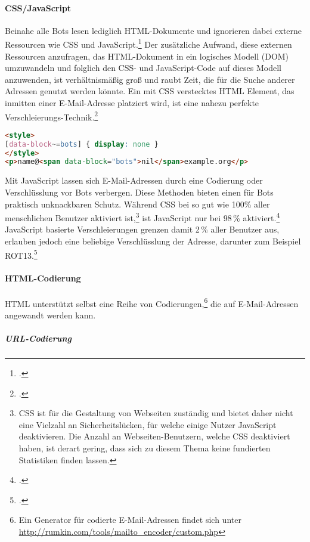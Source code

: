 \paragraph{CSS/JavaScript}
\label{par:cssjavascript}

Beinahe alle Bots lesen lediglich HTML-Dokumente und ignorieren dabei externe
Ressourcen wie CSS und JavaScript.\footcite{hideEmailAddress} Der zusätzliche
Aufwand, diese externen Ressourcen anzufragen, das HTML-Dokument in ein
logisches Modell (DOM) umzuwandeln und folglich den CSS- und JavaScript-Code
auf dieses Modell anzuwenden, ist verhältnismäßig groß und raubt Zeit, die für
die Suche anderer Adressen genutzt werden könnte. Ein mit CSS verstecktes HTML
Element, das inmitten einer E-Mail-Adresse platziert wird, ist eine nahezu
perfekte Verschleierungs-Technik.\footcite{obfuscateEmailAddresses}

\begin{lstlisting}[language=HTML]
<style>
[data-block~=bots] { display: none }
</style>
<p>name@<span data-block="bots">nil</span>example.org</p>
\end{lstlisting}

Mit JavaScript lassen sich E-Mail-Adressen durch eine Codierung oder
Verschlüsslung vor Bots verbergen. Diese Methoden bieten einen für Bots
praktisch unknackbaren Schutz. Während CSS bei so gut wie 100\% aller
menschlichen Benutzer aktiviert ist,\footnote{CSS ist für die Gestaltung von
Webseiten zuständig und bietet daher nicht eine Vielzahl an Sicherheitslücken,
für welche einige Nutzer JavaScript deaktivieren. Die Anzahl an
Webseiten-Benutzern, welche CSS deaktiviert haben, ist derart gering, dass sich
zu diesem Thema keine fundierten Statistiken finden lassen.} ist JavaScript nur
bei 98\,\% aktiviert.\footcite{javaScriptDisableStats} JavaScript basierte
Verschleierungen grenzen damit 2\,\% aller Benutzer aus, erlauben jedoch eine
beliebige Verschlüsslung der Adresse, darunter zum Beispiel
ROT13.\footcite{modernCryptanalysis}

\paragraph{HTML-Codierung}
\label{par:html-codierung}

HTML unterstützt selbst eine Reihe von Codierungen,\footnote{Ein Generator für
codierte E-Mail-Adressen findet sich unter
\url{http://rumkin.com/tools/mailto_encoder/custom.php}} die auf
E-Mail-Adressen angewandt werden kann.

\subparagraph{URL-Codierung}
\label{spar:url-codierung}

